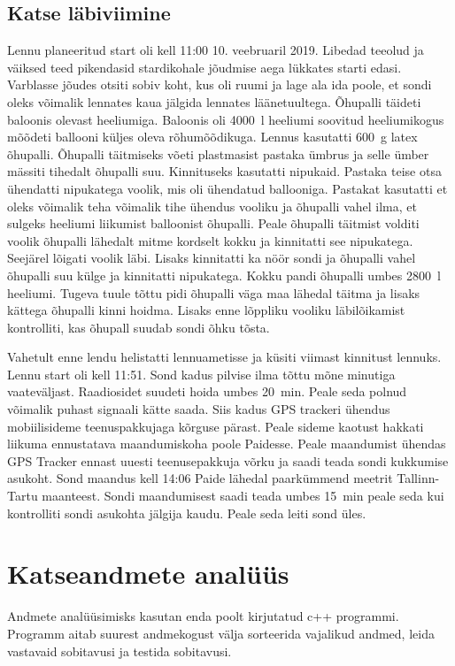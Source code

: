 \documentclass{trkut}%
\begin{document}
\section{Katse läbiviimine}
Lennu planeeritud start oli kell 11:00 10. veebruaril 2019. Libedad teeolud ja väiksed teed pikendasid stardikohale jõudmise aega lükkates starti edasi. Varblasse jõudes otsiti sobiv koht, kus oli ruumi ja lage ala ida poole, et sondi oleks võimalik lennates kaua jälgida lennates läänetuultega. Õhupalli täideti baloonis olevast heeliumiga. Baloonis oli \SI{4000}{l} heeliumi soovitud heeliumikogus mõõdeti ballooni küljes oleva rõhumõõdikuga. Lennus kasutatti \SI{600}{g} latex õhupalli. Õhupalli täitmiseks võeti plastmasist pastaka ümbrus ja selle ümber mässiti tihedalt õhupalli suu. Kinnituseks kasutatti nipukaid. Pastaka teise otsa ühendatti nipukatega voolik, mis oli ühendatud ballooniga. Pastakat kasutatti et oleks võimalik teha võimalik tihe ühendus vooliku ja õhupalli vahel ilma, et sulgeks heeliumi liikumist balloonist õhupalli. Peale õhupalli täitmist volditi voolik õhupalli lähedalt mitme kordselt kokku ja kinnitatti see nipukatega. Seejärel lõigati voolik läbi. Lisaks kinnitatti ka nöör sondi ja õhupalli vahel õhupalli suu külge ja kinnitatti nipukatega. Kokku pandi õhupalli umbes \SI{2800}{l} heeliumi. Tugeva tuule tõttu pidi õhupalli väga maa lähedal täitma ja lisaks kättega õhupalli kinni hoidma. Lisaks enne lõppliku vooliku läbilõikamist kontrolliti, kas õhupall suudab sondi õhku tõsta.

Vahetult enne lendu helistatti lennuametisse ja küsiti viimast kinnitust lennuks. Lennu start oli kell 11:51. Sond kadus pilvise ilma tõttu mõne minutiga vaateväljast. Raadiosidet suudeti hoida umbes \SI{20}{min}. Peale seda polnud võimalik puhast signaali kätte saada. Siis kadus GPS trackeri ühendus mobiilisideme teenuspakkujaga kõrguse pärast. Peale sideme kaotust hakkati liikuma ennustatava maandumiskoha poole Paidesse. Peale maandumist ühendas GPS Tracker ennast uuesti teenusepakkuja võrku ja saadi teada sondi kukkumise asukoht. Sond maandus kell 14:06 Paide lähedal paarkümmend meetrit Tallinn-Tartu maanteest. Sondi maandumisest saadi teada umbes \SI{15}{min} peale seda kui kontrolliti sondi asukohta jälgija kaudu. Peale seda leiti sond üles.






\chapter{Katseandmete analüüs}
Andmete analüüsimisks kasutan enda poolt kirjutatud c++ programmi. Programm aitab suurest andmekogust välja sorteerida vajalikud andmed, leida vastavaid sobitavusi ja testida sobitavusi.
\end{document}
